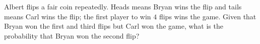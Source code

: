 Albert flips a fair coin repeatedly. Heads means Bryan wins the flip and tails means Carl wins the flip; the first player to win $4$ flips wins the game. Given that Bryan won the first and third flips but Carl won the game, what is the probability that Bryan won the second flip?
